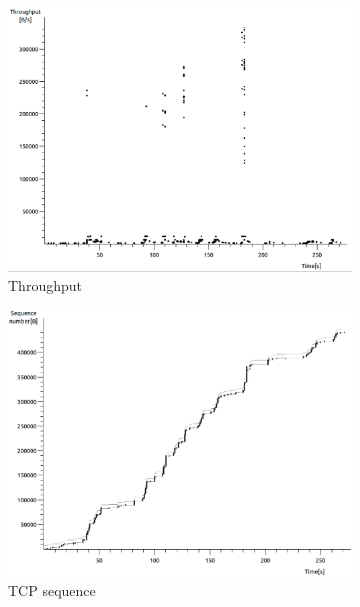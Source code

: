 \documentclass[conference,a4paper]{IEEEtran}
\begin{document}
\begin{figure}
 \centering
 \begin{subfigure}[b]{0.2\textwidth}
  \includegraphics[width=\textwidth]{s5-1_th}
  \caption{Throughput}
 \end{subfigure}
 \begin{subfigure}[b]{0.2\textwidth}
  \includegraphics[width=\textwidth]{s5-1_seq}
  \caption{TCP sequence}
 \end{subfigure}
 \begin{subfigure}[b]{0.2\textwidth}

\end{subfigure}
\end{figure}
\end{document}
